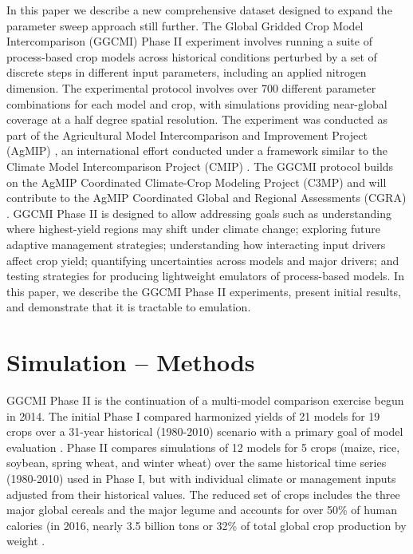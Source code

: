 \documentclass[preprint, 5p, times, twocolumn]{elsarticle}
\begin{document}
In this paper we describe a new comprehensive dataset designed to expand the parameter sweep approach still further. The Global Gridded Crop Model Intercomparison (GGCMI) Phase II experiment involves running a suite of process-based crop models across historical conditions perturbed by a set of discrete steps in different input parameters, including an applied nitrogen dimension. The experimental protocol involves over 700 different parameter combinations for each model and crop, with simulations providing near-global coverage at a half degree spatial resolution. The experiment was conducted as part of the Agricultural Model Intercomparison and Improvement Project (AgMIP) \citep{ROSENZWEIG2013, Rosenzweig2014}, an international effort conducted under a framework similar to the Climate Model Intercomparison Project (CMIP) \citep{Taylor2012, Eyring2016}. The GGCMI protocol builds on the AgMIP Coordinated Climate-Crop Modeling Project (C3MP) \citep{ruane2014, mcdermid2015} and will contribute to the AgMIP Coordinated Global and Regional Assessments (CGRA) \citep{ruane2018, rosenzweig2018}. GGCMI Phase II is designed to allow addressing goals such as understanding where highest-yield regions may shift under climate change; exploring future adaptive management strategies; understanding how interacting input drivers affect crop yield; quantifying uncertainties across models and major drivers; and testing strategies for producing lightweight emulators of process-based models. In this paper, we describe the GGCMI Phase II experiments, present initial results, and demonstrate that it is tractable to emulation.

\section{Simulation -- Methods}
\label{S:2}
GGCMI Phase II is the continuation of a multi-model comparison exercise begun in 2014. The initial Phase I compared harmonized yields of 21 models for 19 crops over a 31-year historical (1980-2010) scenario with a primary goal of model evaluation \citep{Elliott2015, muller_global_2017}. Phase II compares simulations of 12 models for 5 crops (maize, rice, soybean, spring wheat, and winter wheat) over the same historical time series (1980-2010) used in Phase I, but with individual climate or management inputs adjusted from their historical values. The reduced set of crops includes the three major global cereals and the major legume and accounts for over 50\% of human calories (in 2016, nearly 3.5 billion tons or 32\% of total global crop production by weight \citep{FAOSTAT}. 
\end{document}

